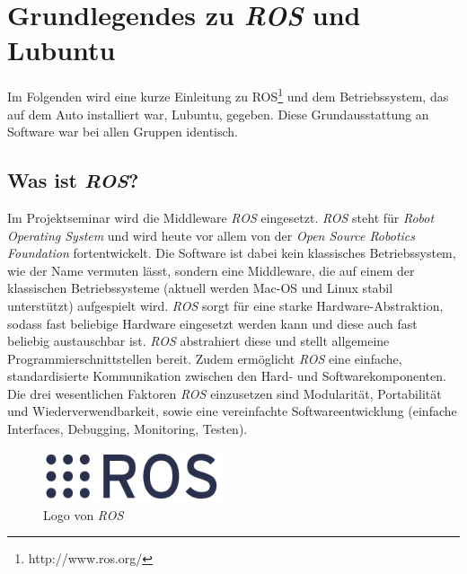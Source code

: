 \section{Grundlegendes zu \textit{ROS} und Lubuntu}
\label{sec:grundlegendesROS-OS}   
Im Folgenden wird eine kurze Einleitung zu ROS\footnote[1]{http://www.ros.org/}  und dem Betriebssystem, das auf dem Auto installiert war, Lubuntu, gegeben. Diese Grundausstattung an Software war bei allen Gruppen identisch.
\subsection{Was ist \textit{ROS}?}
Im Projektseminar wird die Middleware \textit{ROS} eingesetzt. \textit{ROS} steht für \textit{Robot Operating System} und wird heute vor allem von der \textit{Open Source Robotics Foundation} fortentwickelt. Die Software ist dabei kein klassisches Betriebssystem, wie der Name vermuten lässt, sondern eine Middleware, die auf einem der klassischen Betriebssysteme (aktuell werden Mac-OS und Linux stabil unterstützt) aufgespielt wird. \textit{ROS} sorgt für eine starke Hardware-Abstraktion, sodass fast beliebige Hardware eingesetzt werden kann und diese auch fast beliebig austauschbar ist. \textit{ROS} abstrahiert diese und stellt allgemeine Programmierschnittstellen bereit. Zudem ermöglicht \textit{ROS} eine einfache, standardisierte Kommunikation zwischen den Hard- und Softwarekomponenten.
Die drei wesentlichen Faktoren \textit{ROS} einzusetzen sind Modularität, Portabilität und Wiederverwendbarkeit, sowie eine vereinfachte Softwareentwicklung (einfache Interfaces, Debugging, Monitoring, Testen).

\begin{figure}[htbp] 
	\centering
	\includegraphics[width=150pt]{images/rosorg-logo1.png}
	\caption{Logo von \textit{ROS}}
	\label{fig:LogoROS}
\end{figure}

